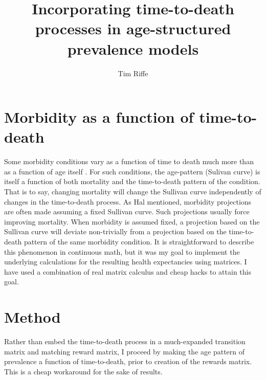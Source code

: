 \documentclass[11pt,oneside,a4paper]{article} %
\begin{document}
\title{Incorporating time-to-death processes in age-structured prevalence
models}

\author[1]{Tim Riffe}


\maketitle


\section{Morbidity as a function of time-to-death}
 
 Some morbidity conditions vary as a function of time to death much more than as
 a function of age itself \citep{riffe2015ttd}. For such conditions, the
 age-pattern (Sulivan curve) is itself a function of both mortality and the
 time-to-death pattern of the condition. That is to say, changing mortality will
 change the Sullivan curve independently of changes in the time-to-death
 process. As Hal mentioned, morbidity projections are often made assuming a
 fixed Sullivan curve. Such projections usually force improving mortality. When
 morbidity is assumed fixed, a projection based on the Sullivan curve will
 deviate non-trivially from a projection based on the time-to-death pattern of
 the same morbidity condition. It is straightforward to describe this phenomenon
 in continuous math, but it was my goal to implement the underlying calculations
 for the resulting health expectancies using matrices. I have used a combination
 of real matrix calculus and cheap hacks to attain this goal.
 
 \section{Method}
 
 Rather than embed the time-to-death process in a much-expanded transition
 matrix and matching reward matrix, I proceed by making the age pattern of
 prevalence a function of time-to-death, prior to creation of the rewards
 matrix. This is a cheap workaround for the sake of results.
 
\end{document}
